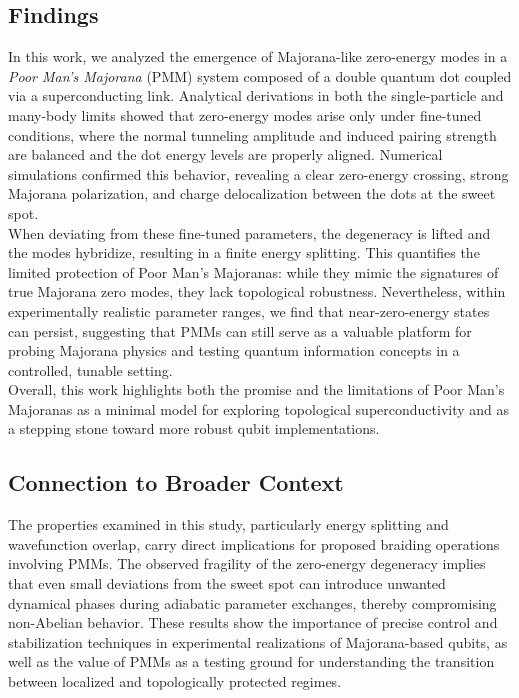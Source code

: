 \documentclass[11pt, letterpaper, titlepage]{article}
\begin{document}
\subsection{Findings}
In this work, we analyzed the emergence of Majorana-like zero-energy modes in a \textit{Poor Man’s Majorana} (PMM) system composed of a double quantum dot coupled via a superconducting link. Analytical derivations in both the single-particle and many-body limits showed that zero-energy modes arise only under fine-tuned conditions, where the normal tunneling amplitude and induced pairing strength are balanced and the dot energy levels are properly aligned. Numerical simulations confirmed this behavior, revealing a clear zero-energy crossing, strong Majorana polarization, and charge delocalization between the dots at the sweet spot. \\
When deviating from these fine-tuned parameters, the degeneracy is lifted and the modes hybridize, resulting in a finite energy splitting. This quantifies the limited protection of Poor Man’s Majoranas: while they mimic the signatures of true Majorana zero modes, they lack topological robustness. Nevertheless, within experimentally realistic parameter ranges, we find that near-zero-energy states can persist, suggesting that PMMs can still serve as a valuable platform for probing Majorana physics and testing quantum information concepts in a controlled, tunable setting. \\
Overall, this work highlights both the promise and the limitations of Poor Man’s Majoranas as a minimal model for exploring topological superconductivity and as a stepping stone toward more robust qubit implementations.

\subsection{Connection to Broader Context}
The properties examined in this study, particularly energy splitting and wavefunction overlap, carry direct implications for proposed braiding operations involving PMMs. The observed fragility of the zero-energy degeneracy implies that even small deviations from the sweet spot can introduce unwanted dynamical phases during adiabatic parameter exchanges, thereby compromising non-Abelian behavior. These results show the importance of precise control and stabilization techniques in experimental realizations of Majorana-based qubits, as well as the value of PMMs as a testing ground for understanding the transition between localized and topologically protected regimes.
\end{document}
